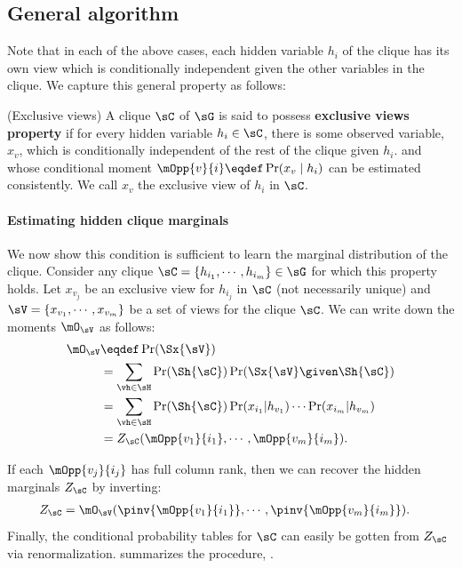 \subsection{General algorithm}
\label{sec:directedGeneral}

Note that in each of the above cases,
each hidden variable $h_i$ of the clique has its own view which is conditionally independent
given the other variables in the clique.
We capture this general property as follows:
\begin{property}(Exclusive views)
  \label{prop:exclusive-views}
  A clique $\sC$ of $\sG$ is said to possess \textbf{exclusive views property} if for every hidden variable $h_i \in \sC$,
  there is some observed variable, $x_{v}$, which is conditionally
  independent of the rest of the clique given $h_i$.
  and whose conditional
  moment $\mOpp{v}{i} \eqdef \Pr(x_{v} \mid h_i)$ can be estimated consistently.
We call $x_v$ the exclusive view of $h_i$ in $\sC$.
\end{property}

\paragraph{Estimating hidden clique marginals}

We now show this condition is sufficient to learn the marginal
  distribution of the clique.
Consider any clique $\sC = \{h_{i_1}, \cdots, h_{i_m}\} \in \sG$ for which this property holds. Let
  $x_{v_j}$ be an exclusive view for $h_{i_j}$ in $\sC$ (not necessarily unique) and $\sV
  = \{x_{v_1}, \cdots, x_{v_m}\}$ be a set of views for the clique $\sC$.
We can write down the moments $\mO_\sV$ as follows:
\begin{align*}
  \mO_\sV 
  &\eqdef \Pr(\Sx{\sV}) \\
  &= \sum_{\vh \in \sH}
      \Pr(\Sh{\sC}) \Pr(\Sx{\sV} \given \Sh{\sC}) \\
      &= \sum_{\vh \in \sH} \Pr(\Sh{\sC}) 
          \Pr(x_{i_1} | h_{v_1}) \cdots \Pr(x_{i_m} | h_{v_m}) \\
    &= Z_{\sC}(\mOpp{v_1}{i_1},\cdots,\mOpp{v_m}{i_m}).
\end{align*}

If each $\mOpp{v_j}{i_j}$ has full column rank, then we can recover the
hidden marginals $Z_\sC$ by inverting:
\begin{align*}
  Z_{\sC} &= \mO_\sV(\pinv{\mOpp{v_1}{i_1}},\cdots,\pinv{\mOpp{v_m}{i_m}}).
\end{align*}
Finally, the conditional probability tables for $\sC$ can easily be gotten from
  $Z_\sC$ via renormalization.
 summarizes the procedure, \LearnClique.

